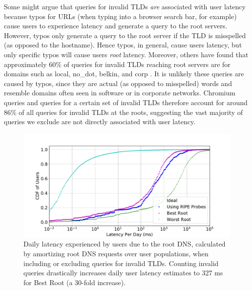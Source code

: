 \documentclass[sigconf,letterpaper,nonacm,10pt,anonymous]{acmart}
\begin{document}
Some might argue that queries for invalid TLDs \emph{are} associated
with user latency because typos for URLs (when typing into a browser
search bar, for example) cause users to experience latency and generate
a query to the root servers. However, typos only generate a query to the
root server if the TLD is misspelled (as opposed to the hostname). Hence
typos, in general, cause users latency, but only specific typos will
cause users \emph{root} latency. Moreover, others have found that
approximately 60\% of queries for invalid TLDs reaching root servers are
for domains such as local, no\_dot, belkin, and corp
\cite{gao2014reexamining}. It is unlikely these queries are caused by
typos, since they are actual (as opposed to misspelled) words and
resemble domains often seen in software or in corporate networks.
Chromium queries and queries for a certain set of invalid TLDs therefore
account for around 86\% of all queries for invalid TLDs at the roots,
suggesting the vast majority of queries we exclude are not directly
associated with user latency.

\begin{figure}
    \centering
    \includegraphics[width=\linewidth]{figures/include_invalid_daily_root_latency.pdf}
    \caption{Daily latency experienced by users due to the root DNS, calculated by amortizing root DNS requests over user populations, when including or excluding queries for invalid TLDs. Counting invalid queries drastically increases daily user latency estimates to 327 ms for Best Root (a 30-fold increase). }
    \label{fig:include_invalid_daily_root_latency}
\end{figure}
\end{document}
